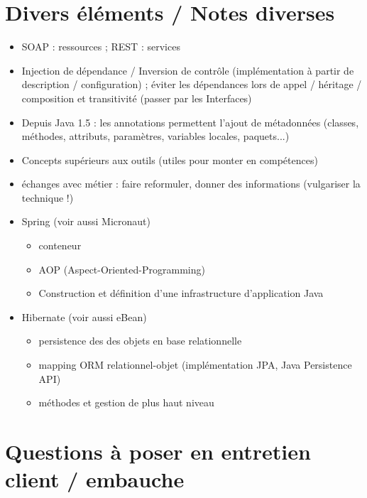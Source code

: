 \documentclass[11pt,twoside,a4paper]{article}
\begin{document}
\begin{landscape}
\begin{multicols}{2}
	\vfill
	
	\columnbreak
	
	
	
	
	\section*{Divers {\'e}l{\'e}ments / Notes diverses}
	
	\begin{itemize}
		\item SOAP : ressources ; REST : services
		\item Injection de d{\'e}pendance / Inversion de contr{\^o}le (impl{\'e}mentation {\`a} partir de description / configuration) ; {\'e}viter les d{\'e}pendances lors de appel / h{\'e}ritage / composition et transitivit{\'e} (passer par les Interfaces)
		\item Depuis Java 1.5 : les annotations permettent l'ajout de m{\'e}tadonn{\'e}es (classes, m{\'e}thodes, attributs, param{\`e}tres, variables locales, paquets...)
		\item Concepts sup{\'e}rieurs aux outils (utiles pour monter en comp{\'e}tences)
		\item {\'e}changes avec m{\'e}tier : faire reformuler, donner des informations (vulgariser la technique !)
		\item Spring (voir aussi Micronaut)
		\begin{itemize}
			\item conteneur
			\item AOP (Aspect-Oriented-Programming)
			\item Construction et d{\'e}finition d'une infrastructure d'application Java
		\end{itemize}
		\item Hibernate (voir aussi eBean)
		\begin{itemize}
			\item persistence des des objets en base relationnelle
			\item mapping ORM relationnel-objet (impl{\'e}mentation JPA, Java Persistence API)
			\item m{\'e}thodes et gestion de plus haut niveau
		\end{itemize}
	\end{itemize}
	
	\section*{Questions {\`a} poser en entretien client / embauche}
	

\end{multicols}
\end{landscape}
\end{document}
